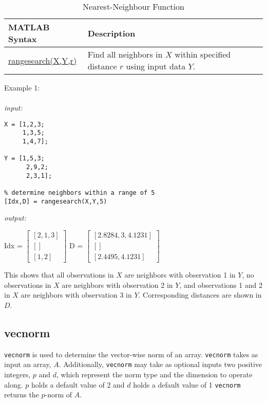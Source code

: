 \documentclass[../MATLAB_Primer.tex]{subfiles}
\begin{document}
\begin{table}[H]
\caption{Nearest-Neighbour Function}
    \begin{center}
        \begin{tabular}{| C{3cm} | m{12cm}|}
            \hline
            \textbf{MATLAB Syntax} & \textbf{Description}\\
            
            \hline
            \href{https://www.mathworks.com/help/stats/rangesearch.html}{\color{blue}rangesearch(X,Y,r)} & Find all neighbors in $X$ within specified distance $r$ using input data $Y$. \\
            \hline
            
        \end{tabular}
        \label{tab:rangesearch}
    \end{center}
\end{table}

Example 1:
\\ \\
\textit{input:}
\begin{lstlisting}[frame=single]
% consider two sets of observations X & Y
X = [1,2,3;
     1,3,5;
     1,4,7];
     
Y = [1,5,3;
      2,9,2;
      2,3,1];
      
% determine neighbors within a range of 5
[Idx,D] = rangesearch(X,Y,5)
\end{lstlisting}

\textit{output:}

\begin{center}
    Idx = 
    $\begin{bmatrix}
    [2,1,3]\\
    []\\
    [1,2]
    \end{bmatrix}$
    D = 
    $\begin{bmatrix}
    [2.8284,3,4.1231]\\
    []\\
    [2.4495,4.1231]
    \end{bmatrix}$
\end{center}

This shows that all observations in $X$ are neighbors with observation 1 in $Y$, no observations in $X$ are neighbors with observation 2 in $Y$, and observations 1 and 2 in $X$ are neighbors with observation 3 in $Y$. Corresponding distances are shown in $D$.

\subsection{vecnorm}
\texttt{vecnorm} is used to determine the vector-wise norm  of an array. \texttt{vecnorm} takes as input an array, $A$. Additionally, \texttt{vecnorm} may take as optional inputs two positive integers, $p$ and $d$, which represent the norm type and the dimension to operate along. $p$ holds a default value of 2 and $d$ holds a default value of 1 \texttt{vecnorm} returns the $p$-norm of $A$.\\
\end{document}
